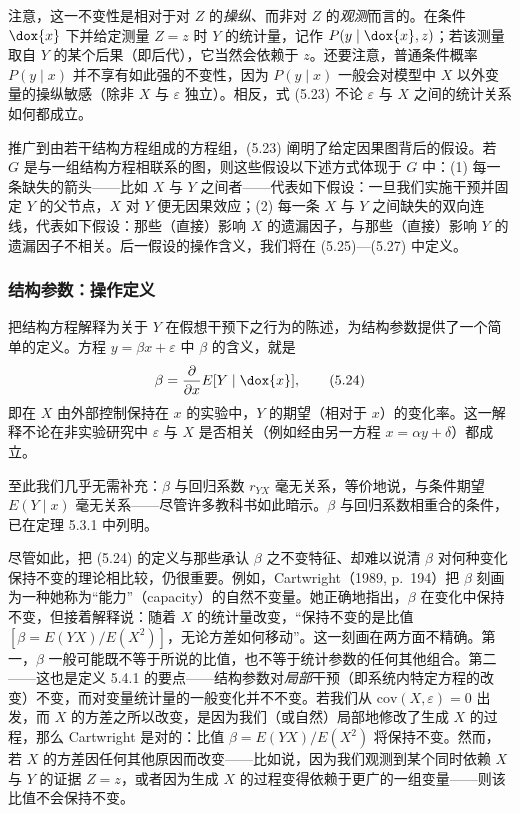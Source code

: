 注意，这一不变性是相对于对 $Z$ 的\emph{操纵}、而非对 $Z$ 的\emph{观测}而言的。在条件 $\dox{x}$ 下并给定测量 $Z=z$ 时 $Y$ 的统计量，记作 $P(y\mid \dox{x},z)$；若该测量取自 $Y$ 的某个后果（即后代），它当然会依赖于 $z$。还要注意，普通条件概率 $P(y\mid x)$ 并不享有如此强的不变性，因为 $P(y\mid x)$ 一般会对模型中 $X$ 以外变量的操纵敏感（除非 $X$ 与 $\varepsilon$ 独立）。相反，式 \textup{(5.23)} 不论 $\varepsilon$ 与 $X$ 之间的统计关系如何都成立。

推广到由若干结构方程组成的方程组，\textup{(5.23)} 阐明了给定因果图背后的假设。若 $G$ 是与一组结构方程相联系的图，则这些假设以下述方式体现于 $G$ 中：(1) 每一条缺失的箭头——比如 $X$ 与 $Y$ 之间者——代表如下假设：一旦我们实施干预并固定 $Y$ 的父节点，$X$ 对 $Y$ 便无因果效应；(2) 每一条 $X$ 与 $Y$ 之间缺失的双向连线，代表如下假设：那些（直接）影响 $X$ 的遗漏因子，与那些（直接）影响 $Y$ 的遗漏因子不相关。后一假设的操作含义，我们将在 \textup{(5.25)}—\textup{(5.27)} 中定义。

\subsubsection*{结构参数：操作定义}

把结构方程解释为关于 $Y$ 在假想干预下之行为的陈述，为结构参数提供了一个简单的定义。方程 $y=\beta x+\varepsilon$ 中 $\beta$ 的含义，就是
\begin{equation}
\beta=\frac{\partial}{\partial x}E[Y\mid \dox{x}], \tag{5.24}
\end{equation}
即在 $X$ 由外部控制保持在 $x$ 的实验中，$Y$ 的期望（相对于 $x$）的变化率。这一解释不论在非实验研究中 $\varepsilon$ 与 $X$ 是否相关（例如经由另一方程 $x=\alpha y+\delta$）都成立。

至此我们几乎无需补充：$\beta$ 与回归系数 $r_{YX}$ 毫无关系，等价地说，与条件期望 $E(Y\mid x)$ 毫无关系——尽管许多教科书如此暗示。$\beta$ 与回归系数相重合的条件，已在定理 5.3.1 中列明。

尽管如此，把 \textup{(5.24)} 的定义与那些承认 $\beta$ 之不变特征、却难以说清 $\beta$ 对何种变化保持不变的理论相比较，仍很重要。例如，Cartwright（1989, p.~194）把 $\beta$ 刻画为一种她称为“能力”（capacity）的自然不变量。她正确地指出，$\beta$ 在变化中保持不变，但接着解释说：随着 $X$ 的统计量改变，“保持不变的是比值 $[\beta=E(YX)/E(X^2)]$，无论方差如何移动”。这一刻画在两方面不精确。第一，$\beta$ 一般可能既不等于所说的比值，也不等于统计参数的任何其他组合。第二——这也是定义 5.4.1 的要点——结构参数对\emph{局部}干预（即系统内特定方程的改变）不变，而对变量统计量的一般变化并不不变。若我们从 $\mathrm{cov}(X,\varepsilon)=0$ 出发，而 $X$ 的方差之所以改变，是因为我们（或自然）局部地修改了生成 $X$ 的过程，那么 Cartwright 是对的：比值 $\beta=E(YX)/E(X^2)$ 将保持不变。然而，若 $X$ 的方差因任何其他原因而改变——比如说，因为我们观测到某个同时依赖 $X$ 与 $Y$ 的证据 $Z=z$，或者因为生成 $X$ 的过程变得依赖于更广的一组变量——则该比值不会保持不变。

